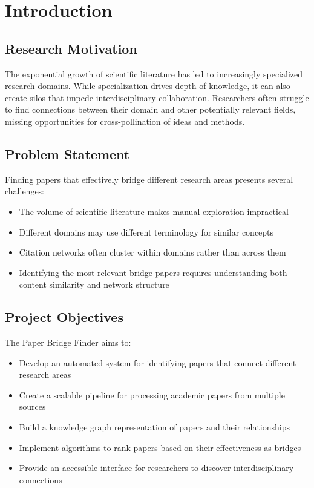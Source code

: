 \documentclass[11pt,a4paper]{article}
\begin{document}
\section{Introduction}

\subsection{Research Motivation}

The exponential growth of scientific literature has led to increasingly specialized research domains. While specialization drives depth of knowledge, it can also create silos that impede interdisciplinary collaboration. Researchers often struggle to find connections between their domain and other potentially relevant fields, missing opportunities for cross-pollination of ideas and methods.

\subsection{Problem Statement}

Finding papers that effectively bridge different research areas presents several challenges:
\begin{itemize}
    \item The volume of scientific literature makes manual exploration impractical
    \item Different domains may use different terminology for similar concepts
    \item Citation networks often cluster within domains rather than across them
    \item Identifying the most relevant bridge papers requires understanding both content similarity and network structure
\end{itemize}

\subsection{Project Objectives}

The Paper Bridge Finder aims to:
\begin{itemize}
    \item Develop an automated system for identifying papers that connect different research areas
    \item Create a scalable pipeline for processing academic papers from multiple sources
    \item Build a knowledge graph representation of papers and their relationships
    \item Implement algorithms to rank papers based on their effectiveness as bridges
    \item Provide an accessible interface for researchers to discover interdisciplinary connections
\end{itemize}
\end{document}
